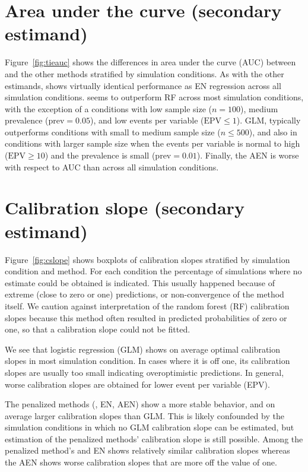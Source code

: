\documentclass[a4paper, 11pt]{article}
\begin{document}
\section{Area under the curve (secondary estimand)}
Figure~\ref{fig:tieauc} shows the differences in area under the curve (AUC)
between \ainet{} and the other methods stratified by simulation conditions.
As with the other estimands, \ainet{} shows virtually identical performance
as EN regression across all simulation conditions.
\ainet{} seems to outperform RF across most simulation conditions, with the
exception of a conditions with low sample size ($n = 100$), medium prevalence
($\mbox{prev} = 0.05$), and low events per variable ($\mbox{EPV} \leq 1$).
GLM, typically outperforms \ainet{} conditions with small to medium sample size
($n \leq 500$), and also in conditions with larger sample size when the
events per variable is normal to high ($\mbox{EPV} \geq 10$) and the prevalence
is small ($\mbox{prev}  = 0.01$).
Finally, the AEN is worse with respect to AUC than \ainet{} across all
simulation conditions.

\section{Calibration slope (secondary estimand)}
Figure~\ref{fig:cslope} shows boxplots of calibration slopes stratified by
simulation condition and method. For each condition the percentage of
simulations where no estimate could be obtained is indicated. This usually
happened because of extreme (close to zero or one) predictions, or
non-convergence of the method itself. We caution against interpretation of the
random forest (RF) calibration slopes because this method often resulted in
predicted probabilities of zero or one, so that a calibration slope could not
be fitted.

We see that logistic regression (GLM) shows on average optimal calibration slopes
in most simulation condition. In cases where it is off one, its calibration
slopes are usually too small indicating overoptimistic predictions. In general,
worse calibration slopes are obtained for lower event per variable (EPV).

The penalized methods (\ainet{}, EN, AEN) show a more stable behavior, and on
average larger calibration slopes than GLM. This is likely confounded by the
simulation conditions in which no GLM calibration slope can be estimated, but
estimation of the penalized methods' calibration slope is still possible. Among
the penalized method's \ainet{} and EN shows relatively similar calibration
slopes whereas the AEN shows worse calibration slopes that are more off the
value of one.
\end{document}
